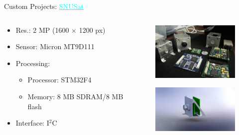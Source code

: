 \begin{frame}{Custom Projects: \href{http://www.madeinepal.com/2016/03/complete-guide-to-designing-camera.html}{\textcolor{cyan}{\underline{SNUSat}}}}

    \begin{columns}[t]
        \begin{column}[t]{0.6\textwidth}
            \begin{itemize}
                \item Res.: 2 MP (1600 $\times$ 1200 px)
                \vspace{0.2cm}
                \item Sensor: Micron MT9D111
                \vspace{0.2cm}
                \item Processing:
                    \begin{itemize}
                        \item Processor: STM32F4
                        \item Memory: 8 MB SDRAM/8 MB flash
                    \end{itemize}
                \vspace{0.2cm}
                \item Interface: I$^{2}$C
            \end{itemize}
        \end{column}
        \begin{column}[t]{0.5\textwidth}
            \begin{figure}[!ht]
                \begin{center}
                    \includegraphics[width=5cm]{figures/snucam}
                \end{center}
            \end{figure}
            \begin{figure}[!ht]
                \begin{center}
                    \includegraphics[width=5cm]{figures/snusat-cam-render}
                \end{center}
            \end{figure}
        \end{column}
    \end{columns}

\end{frame}

